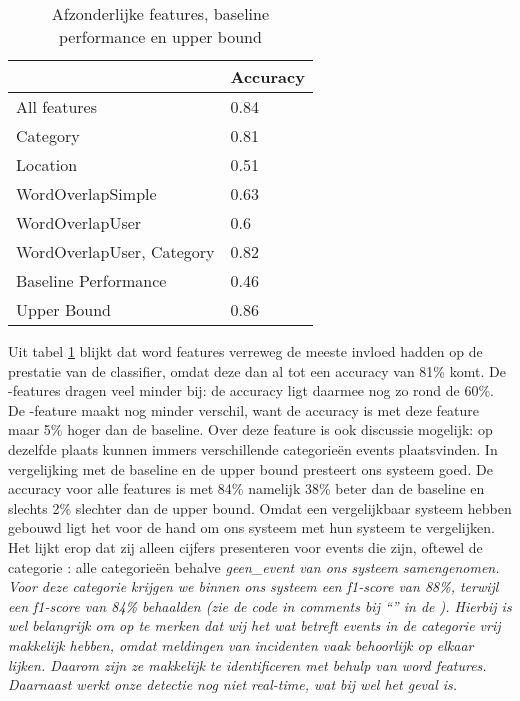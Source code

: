 {{\begin{table}[H]
\centering
\begin{tabular}{|l|l|}
\hline
                          & Accuracy \\ \hline
All features              & 0.84     \\ \hline
Category                  & 0.81     \\ \hline
Location                  & 0.51     \\ \hline
WordOverlapSimple         & 0.63     \\ \hline
WordOverlapUser           & 0.6      \\ \hline
WordOverlapUser, Category & 0.82     \\ \hline
Baseline Performance      & 0.46     \\ \hline
Upper Bound               & 0.86     \\ \hline
\end{tabular}
\caption{Afzonderlijke features, baseline performance en upper bound}\label{testfeatures}
\end{table}

Uit tabel \ref{testfeatures} blijkt dat word features verreweg de meeste invloed hadden op de prestatie van de classifier, omdat deze dan al tot een accuracy
van 81\% komt. De -features dragen veel minder bij: de accuracy ligt daarmee nog zo rond de 60\%. De -feature maakt
nog minder verschil, want de accuracy is met deze feature maar 5\% hoger dan de baseline. Over deze feature is ook discussie
mogelijk: op dezelfde plaats kunnen immers verschillende categorie\"en events plaatsvinden.
\vl
In vergelijking met de baseline en de upper bound presteert ons systeem goed. De accuracy voor alle features is met 84\% namelijk 38\% beter dan de baseline
en slechts 2\% slechter dan de upper bound. Omdat \citeauthor{walther2013geo} een vergelijkbaar systeem hebben gebouwd ligt het voor
de hand om ons systeem met hun systeem te vergelijken. Het lijkt erop dat zij alleen cijfers presenteren voor events die  zijn, oftewel de categorie : alle categorie\"en behalve \it{geen\_event} van ons systeem samengenomen. Voor deze categorie
krijgen we binnen ons systeem een f1-score van 88\%, terwijl \citeauthor{walther2013geo} een f1-score van 84\% behaalden (zie de code
in comments bij ``'' in de ). Hierbij is wel belangrijk om op te merken dat wij
het wat betreft events in de categorie  vrij makkelijk hebben, omdat meldingen van incidenten vaak behoorlijk op elkaar lijken. Daarom 
zijn ze makkelijk te identificeren met behulp van word features. Daarnaast werkt onze detectie nog niet real-time, wat bij \citeauthor{walther2013geo}
wel het geval is.

}}
